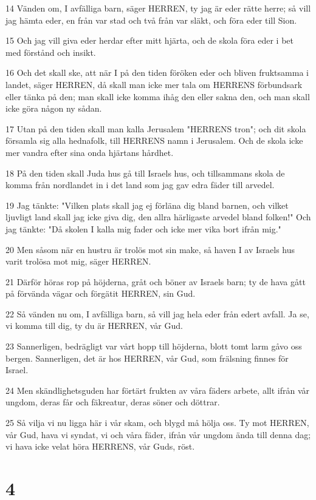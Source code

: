 \par 14 Vänden om, I avfälliga barn, säger HERREN, ty jag är eder rätte herre; så vill jag hämta eder, en från var stad och två från var släkt, och föra eder till Sion.
\par 15 Och jag vill giva eder herdar efter mitt hjärta, och de skola föra eder i bet med förstånd och insikt.
\par 16 Och det skall ske, att när I på den tiden föröken eder och bliven fruktsamma i landet, säger HERREN, då skall man icke mer tala om HERRENS förbundsark eller tänka på den; man skall icke komma ihåg den eller sakna den, och man skall icke göra någon ny sådan.
\par 17 Utan på den tiden skall man kalla Jerusalem "HERRENS tron"; och dit skola församla sig alla hednafolk, till HERRENS namn i Jerusalem. Och de skola icke mer vandra efter sina onda hjärtans hårdhet.
\par 18 På den tiden skall Juda hus gå till Israels hus, och tillsammans skola de komma från nordlandet in i det land som jag gav edra fäder till arvedel.
\par 19 Jag tänkte: "Vilken plats skall jag ej förläna dig bland barnen, och vilket ljuvligt land skall jag icke giva dig, den allra härligaste arvedel bland folken!" Och jag tänkte: "Då skolen I kalla mig fader och icke mer vika bort ifrån mig."
\par 20 Men såsom när en hustru är trolös mot sin make, så haven I av Israels hus varit trolösa mot mig, säger HERREN.
\par 21 Därför höras rop på höjderna, gråt och böner av Israels barn; ty de hava gått på förvända vägar och förgätit HERREN, sin Gud.
\par 22 Så vänden nu om, I avfälliga barn, så vill jag hela eder från edert avfall. Ja se, vi komma till dig, ty du är HERREN, vår Gud.
\par 23 Sannerligen, bedrägligt var vårt hopp till höjderna, blott tomt larm gåvo oss bergen. Sannerligen, det är hos HERREN, vår Gud, som frälsning finnes för Israel.
\par 24 Men skändlighetsguden har förtärt frukten av våra fäders arbete, allt ifrån vår ungdom, deras får och fäkreatur, deras söner och döttrar.
\par 25 Så vilja vi nu ligga här i vår skam, och blygd må hölja oss. Ty mot HERREN, vår Gud, hava vi syndat, vi och våra fäder, ifrån vår ungdom ända till denna dag; vi hava icke velat höra HERRENS, vår Guds, röst.

\chapter{4}


